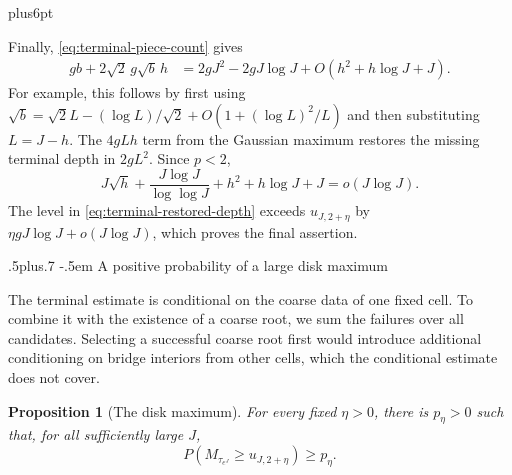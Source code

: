 \documentclass[12pt,reqno]{amsart}
\makeatletter
\def\subsection{\@startsection{subsection}{2}{0pt}%
  {.5\linespacing plus.7\linespacing}
  {-.5em}
  {\normalfont\scshape}}
\theoremstyle{plain}
\newtheorem{proposition}[theorem]{Proposition}
\theoremstyle{definition}
\theoremstyle{remark}
\renewenvironment{proof}[1][\proofname]{%
  \par
  \pushQED{\qed}%
  \normalfont
  \topsep6pt plus6pt\relax
  \trivlist
  \item[\hskip\labelsep\slshape #1\@addpunct{.}]%
  \ignorespaces
}{%
  \popQED
  \endtrivlist
  \@endpefalse
}
\DeclareRobustCommand{\qed}{%
  \leavevmode\unskip\penalty9999\hbox{}\nobreak
  \ifmmode
    \makebox[0pt][l]{\qquad\hbox{\qedsymbol}}%
  \else
    \qquad\hbox{\qedsymbol}%
  \fi
}
\renewcommand{\qedsymbol}{\rule[.47pt]{4pt}{6pt}}
\numberwithin{equation}{section}
\makeatother
\begin{document}
\begin{proof}
Finally, \eqref{eq:terminal-piece-count} gives
\begin{equation}
 \begin{split}
 gb+2\sqrt2\,g\sqrt b\,h
 &=2gJ^2-2gJ\log J+O(h^2+h\log J+J).
 \end{split}
 \label{eq:terminal-restored-depth}
\end{equation}
For example, this follows by first using
$\sqrt b=\sqrt2L-(\log L)/\sqrt2+O(1+(\log L)^2/L)$ and
then substituting $L=J-h$.  The $4gLh$ term from the Gaussian
maximum restores the missing terminal depth in $2gL^2$.
Since $p<2$,
\[
 J\sqrt h+\frac{J\log J}{\log\log J}
 +h^2+h\log J+J=o(J\log J).
\]
The level in \eqref{eq:terminal-restored-depth} exceeds
$u_{J,2+\eta}$ by $\eta gJ\log J+o(J\log J)$, which proves
the final assertion.
\end{proof}

\subsection{A positive probability of a large disk maximum}
\label{sec:disk-lower}

The terminal estimate is conditional on the coarse data of one
fixed cell.  To combine it with the existence of a coarse root, we
sum the failures over all candidates.  Selecting a successful coarse
root first would introduce additional conditioning on bridge
interiors from other cells, which the conditional estimate does not
cover.

\begin{proposition}[The disk maximum]
\label{prop:disk-maximum-lower}
For every fixed $\eta>0$, there is $p_\eta>0$ such that, for all
sufficiently large $J$,
\begin{equation}
 P\left(M_{\tau_{e^J}}\ge u_{J,2+\eta}\right)\ge p_\eta.
 \label{eq:disk-maximum-positive-probability}
\end{equation}
\end{proposition}
\end{document}

